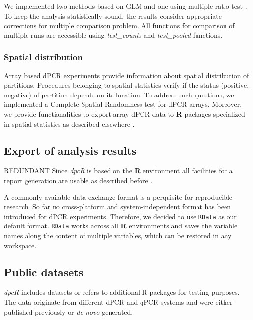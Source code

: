 \documentclass[a4,center,fleqn]{NAR}
\begin{document}
\cite{Burdukiewicz_tba}


We implemented two methods based on GLM and one using  
multiple ratio test \cite{Burdukiewicz_tba, dorazio_statistical_2015}. To 
keep the analysis statistically sound, the results consider appropriate 
corrections for multiple comparison problem. All functions for comparison of 
multiple runs are accessible using \textit{test\_counts} and 
\textit{test_pooled} functions.

\subsubsection{Spatial distribution}

Array based dPCR experiments provide information about spatial distribution of 
partitions. Procedures belonging to spatial statistics verify if the status 
(positive, negative) of partition depends on its location. To address such 
questions, we implemented a Complete Spatial Randomness test for dPCR arrays. 
Moreover, we provide functionalities to export array dPCR data to \textbf{R} 
packages specialized in spatial statistics as described elsewhere 
\cite{Baddeley_2015}.


\subsection{Export of analysis results}
REDUNDANT
Since \textit{dpcR} is based on the \textbf{R} environment all facilities for a 
report generation are usable as described before \cite{rodiger_r_2015}.

A commonly available data exchange format is a perquisite for reproducible 
research. So far no cross-platform and system-independent format has been 
introduced for dPCR experiments. Therefore, we decided to use \texttt{RData} as 
our default format. \texttt{RData} works across all \textbf{R} environments and 
saves the variable names along the content of multiple variables, which can be 
restored in any workspace.


\subsection{Public datasets}

\textit{dpcR} includes datasets or refers to additional R packages for testing 
purposes. The data originate from different dPCR and qPCR systems and were 
either published previously \cite{whale_comparison_2012, roediger2015chippcr, 
white_digital_2009, rodiger_r_2015, dorazio_statistical_2015} or \textit{de 
novo} generated.
\end{document}
